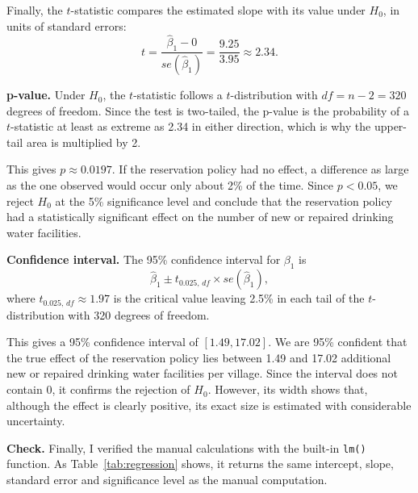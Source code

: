 \documentclass[12pt,letterpaper]{article}
\begin{document}
\begin{enumerate}
		\vspace{.25cm}
		\noindent Finally, the $t$-statistic compares the estimated slope with its value under $H_0$, in units of standard errors:
		\begin{equation*}
			t = \frac{\hat\beta_1 - 0}{se(\hat\beta_1)} = \frac{9.25}{3.95} \approx 2.34.
		\end{equation*}
		
		
		
		\noindent\textbf{p-value.} Under $H_0$, the $t$-statistic follows a $t$-distribution with $df = n - 2 = 320$ degrees of freedom. Since the test is two-tailed, the p-value is the probability of a $t$-statistic at least as extreme as 2.34 in either direction, which is why the upper-tail area is multiplied by 2.
		
		
		
		\noindent This gives $p \approx 0.0197$. If the reservation policy had no effect, a difference as large as the one observed would occur only about 2\% of the time. Since $p < 0.05$, we reject $H_0$ at the 5\% significance level and conclude that the reservation policy had a statistically significant effect on the number of new or repaired drinking water facilities.
		
		\vspace{.25cm}
		\noindent\textbf{Confidence interval.} The 95\% confidence interval for $\beta_1$ is
		\begin{equation*}
			\hat\beta_1 \pm t_{0.025,\,df} \times se(\hat\beta_1),
		\end{equation*}
		where $t_{0.025,\,df} \approx 1.97$ is the critical value leaving 2.5\% in each tail of the $t$-distribution with 320 degrees of freedom.
		
		
		
		\noindent This gives a 95\% confidence interval of $[1.49, 17.02]$. We are 95\% confident that the true effect of the reservation policy lies between 1.49 and 17.02 additional new or repaired drinking water facilities per village. Since the interval does not contain 0, it confirms the rejection of $H_0$. However, its width shows that, although the effect is clearly positive, its exact size is estimated with considerable uncertainty.
		
		\vspace{.25cm}
		\noindent\textbf{Check.} Finally, I verified the manual calculations with the built-in \texttt{lm()} function. As Table~\ref{tab:regression} shows, it returns the same intercept, slope, standard error and significance level as the manual computation.
		

\end{enumerate}
\end{document}
